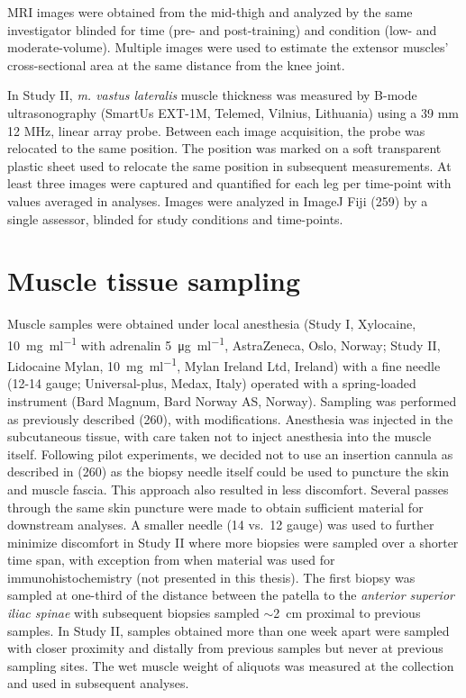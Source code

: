 \documentclass[twoside,10pt]{gihclass} %
\begin{document}
MRI images were obtained from the mid-thigh and analyzed by the same investigator blinded for time (pre- and post-training) and condition (low- and moderate-volume). Multiple images were used to estimate the extensor muscles' cross-sectional area at the same distance from the knee joint.

In Study II, \emph{m. vastus lateralis} muscle thickness was measured by B-mode ultrasonography (SmartUs EXT-1M, Telemed, Vilnius, Lithuania) using a 39 mm 12 MHz, linear array probe. Between each image acquisition, the probe was relocated to the same position. The position was marked on a soft transparent plastic sheet used to relocate the same position in subsequent measurements.
At least three images were captured and quantified for each leg per time-point with values averaged in analyses. Images were analyzed in ImageJ Fiji (259) by a single assessor, blinded for study conditions and time-points.

\hypertarget{muscle-tissue-sampling}{%
\section{Muscle tissue sampling}\label{muscle-tissue-sampling}}

Muscle samples were obtained under local anesthesia (Study I, Xylocaine,
\SI{10}{\mg\per\ml} with adrenalin \SI{5}{\micro\gram\per\ml},
AstraZeneca, Oslo, Norway; Study II, Lidocaine Mylan, \SI{10}{\mg\per\ml}, Mylan Ireland Ltd, Ireland) with a fine needle (12-14 gauge; Universal-plus, Medax, Italy) operated with a spring-loaded instrument (Bard Magnum, Bard Norway AS, Norway). Sampling was performed as previously described (260), with modifications. Anesthesia was injected in the subcutaneous tissue, with care taken not to inject anesthesia into the muscle itself. Following pilot experiments, we decided not to use an insertion cannula as described in (260) as the biopsy needle itself could be used to puncture the skin and muscle fascia. This approach also resulted in less discomfort. Several passes through the same skin puncture were made to obtain sufficient material for downstream analyses. A smaller needle (14 vs.~12 gauge) was used to further minimize discomfort in Study II where more biopsies were sampled over a shorter time span, with exception from when material was used for immunohistochemistry (not presented in this thesis). The first biopsy was
sampled at one-third of the distance between the patella to the \emph{anterior superior iliac spinae} with subsequent biopsies sampled \(\sim\)\SI{2}{cm} proximal to previous samples. In Study II, samples obtained more than one week apart were sampled with closer proximity and distally from previous samples but never at previous sampling sites. The wet muscle weight of aliquots was measured at the collection and used in subsequent analyses.
\end{document}
